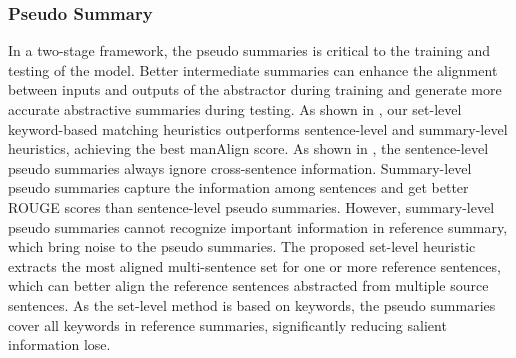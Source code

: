 \subsubsection{Pseudo Summary}
\label{sec:evpseudo}
In a two-stage framework, the pseudo summaries 
is critical to the training and testing of the model.
Better intermediate summaries can enhance the alignment between 
inputs and outputs of the abstractor during training and 
generate more accurate abstractive summaries during testing.
As shown in , 
our set-level keyword-based matching heuristics outperforms 
sentence-level and summary-level heuristics, achieving the best manAlign score.
As shown in , 
the sentence-level pseudo summaries always
ignore cross-sentence information. 
Summary-level pseudo summaries capture the information among sentences
and get better ROUGE scores than sentence-level pseudo summaries.
However, summary-level pseudo summaries cannot recognize important 
information in reference summary, which bring noise to the pseudo summaries. 
The proposed set-level heuristic extracts the most aligned multi-sentence set 
for one or more reference sentences,
which can better align the reference sentences abstracted from 
multiple source sentences. As the set-level method is based on keywords, 
the pseudo summaries cover all keywords in reference summaries,
significantly reducing salient information lose.

